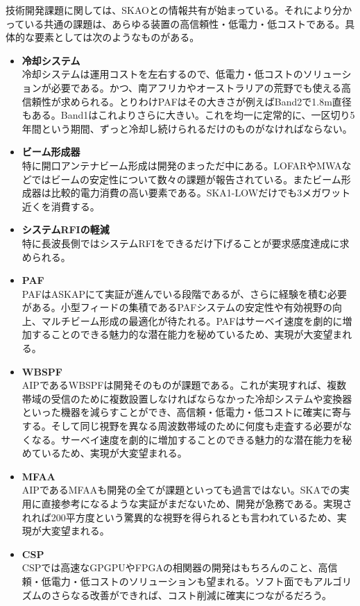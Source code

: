 技術開発課題に関しては、SKAOとの情報共有が始まっている。それにより分かっている共通の課題は、あらゆる装置の高信頼性・低電力・低コストである。具体的な要素としては次のようなものがある。
\begin{itemize}
\item {\bf 冷却システム}\\
冷却システムは運用コストを左右するので、低電力・低コストのソリューションが必要である。かつ、南アフリカやオーストラリアの荒野でも使える高信頼性が求められる。とりわけPAFはその大きさが例えばBand2で1.8m直径もある。Band1はこれよりさらに大きい。これを均一に定常的に、一区切り5年間という期間、ずっと冷却し続けられるだけのものがなければならない。
\item {\bf ビーム形成器}\\
特に開口アンテナビーム形成は開発のまっただ中にある。LOFARやMWAなどではビームの安定性について数々の課題が報告されている。またビーム形成器は比較的電力消費の高い要素である。SKA1-LOWだけでも3メガワット近くを消費する。
\item {\bf システムRFIの軽減}\\
特に長波長側ではシステムRFIをできるだけ下げることが要求感度達成に求められる。
\item {\bf PAF}\\
PAFはASKAPにて実証が進んでいる段階であるが、さらに経験を積む必要がある。小型フィードの集積であるPAFシステムの安定性や有効視野の向上、マルチビーム形成の最適化が待たれる。PAFはサーベイ速度を劇的に増加することのできる魅力的な潜在能力を秘めているため、実現が大変望まれる。
\item {\bf WBSPF}\\
AIPであるWBSPFは開発そのものが課題である。これが実現すれば、複数帯域の受信のために複数設置しなければならなかった冷却システムや変換器といった機器を減らすことができ、高信頼・低電力・低コストに確実に寄与する。そして同じ視野を異なる周波数帯域のために何度も走査する必要がなくなる。サーベイ速度を劇的に増加することのできる魅力的な潜在能力を秘めているため、実現が大変望まれる。
\item {\bf MFAA}\\
AIPであるMFAAも開発の全てが課題といっても過言ではない。SKAでの実用に直接参考になるような実証がまだないため、開発が急務である。実現されれば200平方度という驚異的な視野を得られるとも言われているため、実現が大変望まれる。
\item {\bf CSP}\\
CSPでは高速なGPGPUやFPGAの相関器の開発はもちろんのこと、高信頼・低電力・低コストのソリューションも望まれる。ソフト面でもアルゴリズムのさらなる改善ができれば、コスト削減に確実につながるだろう。

\end{itemize}
